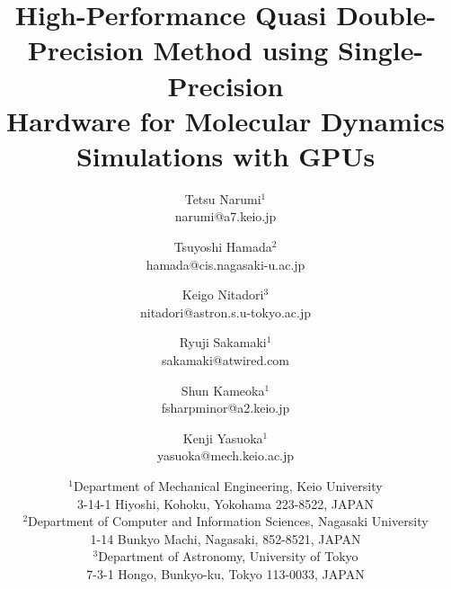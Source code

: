 




\title{High-Performance Quasi Double-Precision Method using Single-Precision \\
       Hardware for Molecular Dynamics Simulations with GPUs}

\author{Tetsu Narumi$^1$\\
narumi@a7.keio.jp \\
\and
Tsuyoshi Hamada$^2$\\
hamada@cis.nagasaki-u.ac.jp\\
\and
Keigo Nitadori$^3$\\
nitadori@astron.s.u-tokyo.ac.jp\\
\and
Ryuji Sakamaki$^1$\\
sakamaki@atwired.com\\
\and
Shun Kameoka$^1$\\
fsharpminor@a2.keio.jp\\
\and
Kenji Yasuoka$^1$\\
yasuoka@mech.keio.ac.jp\vspace*{3mm}\\
\and
$^1$Department of Mechanical Engineering, Keio University \\
3-14-1 Hiyoshi, Kohoku, Yokohama 223-8522, JAPAN\vspace*{3mm}\\
$^2$Department of Computer and Information Sciences, Nagasaki University\\
1-14 Bunkyo Machi, Nagasaki, 852-8521, JAPAN\vspace*{3mm}\\
$^3$Department of Astronomy, University of Tokyo\\
7-3-1 Hongo, Bunkyo-ku, Tokyo 113-0033, JAPAN
}
\maketitle


